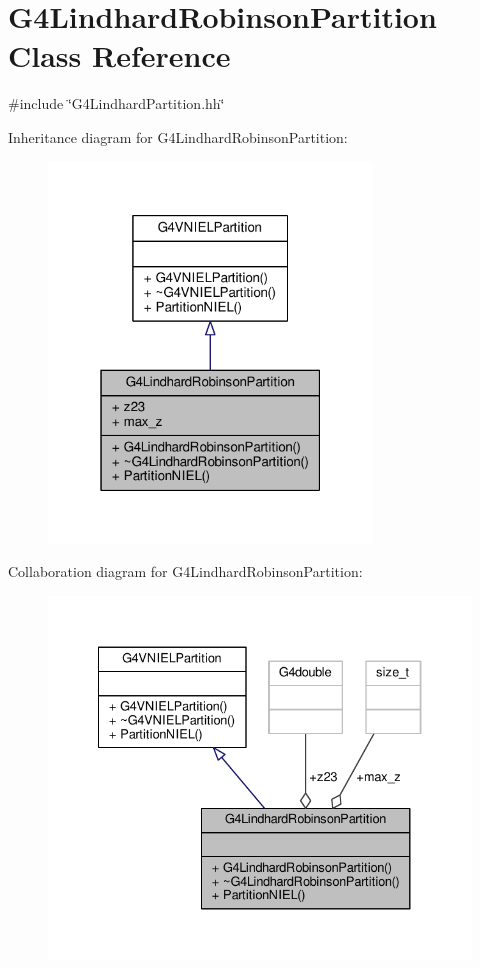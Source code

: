 \hypertarget{classG4LindhardRobinsonPartition}{}\section{G4\+Lindhard\+Robinson\+Partition Class Reference}
\label{classG4LindhardRobinsonPartition}


{\ttfamily \#include \char`\"{}G4\+Lindhard\+Partition.\+hh\char`\"{}}



Inheritance diagram for G4\+Lindhard\+Robinson\+Partition\+:
\nopagebreak
\begin{figure}[H]
\begin{center}
\leavevmode
\includegraphics[width=244pt]{classG4LindhardRobinsonPartition__inherit__graph}
\end{center}
\end{figure}


Collaboration diagram for G4\+Lindhard\+Robinson\+Partition\+:
\nopagebreak
\begin{figure}[H]
\begin{center}
\leavevmode
\includegraphics[width=334pt]{classG4LindhardRobinsonPartition__coll__graph}
\end{center}
\end{figure}
